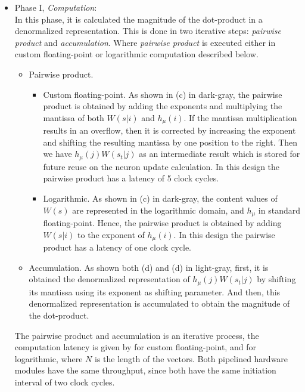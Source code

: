  \begin{itemize}
 	\item{Phase I, \emph{Computation}}: 
 	\\In this phase, it is calculated the magnitude of the dot-product in a denormalized representation. This is done in two iterative steps: \emph{pairwise product} and \emph{accumulation}. Where \emph{pairwise product} is executed either in custom floating-point or logarithmic computation described below.
 	 \begin{itemize}[label={--}]
 	 	\item{Pairwise product}.
 	 	\begin{itemize} [label={--}]
	 		\item{Custom floating-point}.
	 	 	As shown in (c) in dark-gray, the pairwise product is obtained by adding the exponents and multiplying the mantissa of both $W(s|i)$ and $h_\mu(i)$. If the mantissa multiplication results in an overflow, then it is corrected by increasing the  exponent and shifting the resulting mantissa by one position to the right. Then we have $h_\mu(j) W(s_t|j)$ as an intermediate result which is stored for future reuse on the neuron update calculation. In this design the pairwise product has a latency of 5 clock cycles.
	 	 	\item{Logarithmic}.
	 	 	As shown in (c) in dark-gray, the content values of $W(s)$ are represented in the logarithmic domain, and $h_\mu$ in standard floating-point. Hence, the pairwise product is obtained by adding $W(s|i)$ to the exponent of $h_\mu(i)$. In this design the pairwise product has a latency of one clock cycle.
 	 	\end{itemize}
 		\item{Accumulation}. As shown both (d) and (d) in light-gray, first, it is obtained the denormalized representation of $h_\mu(j) W(s_t|j)$ by shifting its mantissa using its exponent as shifting parameter. And then, this denormalized representation is accumulated to obtain the magnitude of the dot-product.
 	 \end{itemize}
 	The pairwise product and accumulation is an iterative process, the computation latency is given by  for custom floating-point, and  for logarithmic, where $N$ is the length of the vectors. Both pipelined hardware modules have the same throughput, since both have the same initiation interval of two clock cycles.
 	

\end{itemize}
